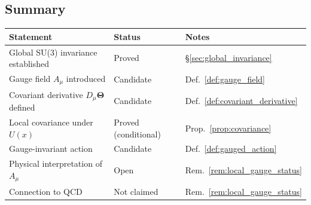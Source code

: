 \subsection{Summary}

\begin{center}
\begin{tabular}{lll}
  \hline
  Statement & Status & Notes \\
  \hline
  Global SU(3) invariance established & Proved & \S\ref{sec:global_invariance} \\
  Gauge field $A_\mu$ introduced & Candidate & Def.~\ref{def:gauge_field} \\
  Covariant derivative $D_\mu\boldsymbol{\Theta}$ defined & Candidate & Def.~\ref{def:covariant_derivative} \\
  Local covariance under $U(x)$ & Proved (conditional) & Prop.~\ref{prop:covariance} \\
  Gauge-invariant action & Candidate & Def.~\ref{def:gauged_action} \\
  Physical interpretation of $A_\mu$ & Open & Rem.~\ref{rem:local_gauge_status} \\
  Connection to QCD & Not claimed & Rem.~\ref{rem:local_gauge_status} \\
  \hline
\end{tabular}
\end{center}

